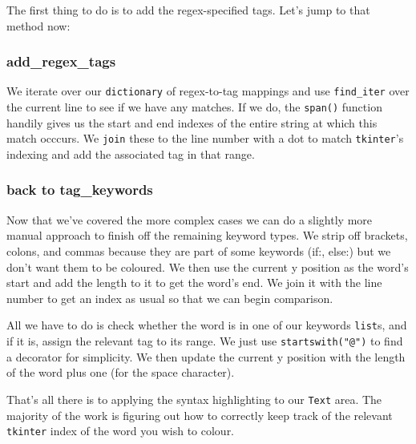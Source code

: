 \documentclass[a4paper,11pt,openany]{book}
\begin{document}
\vspace{5mm}

The first thing to do is to add the regex-specified tags. Let's jump to that method now:

\subsubsection{add\_regex\_tags}

We iterate over our \lstinline[columns=fixed]{dictionary} of regex-to-tag mappings and use \lstinline[columns=fixed]{find_iter} over the current line to see if we have any matches. If we do, the \lstinline[columns=fixed]{span()} function handily gives us the start and end indexes of the entire string at which this match occcurs. We \lstinline[columns=fixed]{join} these to the line number with a dot to match \lstinline[columns=fixed]{tkinter}'s indexing and add the associated tag in that range. 

\subsubsection{back to tag\_keywords}

Now that we've covered the more complex cases we can do a slightly more manual approach to finish off the remaining keyword types. We strip off brackets, colons, and commas because they are part of some keywords (if:, else:) but we don't want them to be coloured. We then use the current y position as the word's start and add the length to it to get the word's end. We join it with the line number to get an index as usual so that we can begin comparison.  

\vspace{5mm}

All we have to do is check whether the word is in one of our keywords \lstinline[columns=fixed]{list}s, and if it is, assign the relevant tag to its range. We just use \lstinline[columns=fixed]{startswith("@")} to find a decorator for simplicity. We then update the current y position with the length of the word plus one (for the space character). 

\vspace{5mm}

That's all there is to applying the syntax highlighting to our \lstinline[columns=fixed]{Text} area. The majority of the work is figuring out how to correctly keep track of the relevant \lstinline[columns=fixed]{tkinter} index of the word you wish to colour. 
\end{document}

